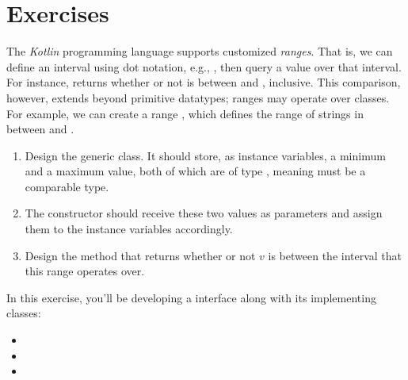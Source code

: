 \section{Exercises}


The \emph{Kotlin} programming language supports customized \emph{ranges}. That is, we can define an interval using dot notation, e.g., , then query a value over that interval. For instance,  returns whether or not  is between  and , inclusive. This comparison, however, extends beyond primitive datatypes; ranges may operate over classes. For example, we can create a range , which defines the range of strings in between  and .

\begin{enumerate}[label=(\alph*)]
    \item Design the generic  class. It should store, as instance variables, a minimum and a maximum value, both of which are of type , meaning  must be a comparable type.
    \item The  constructor should receive these two values as parameters and assign them to the instance variables accordingly. 
    \item Design the  method that returns whether or not $v$ is between the interval that this range operates over. 
\end{enumerate}


 In this exercise, you'll be developing a  interface along with its implementing classes:
\begin{itemize}
\item {}
\item {}
\item {}
\end{itemize}

